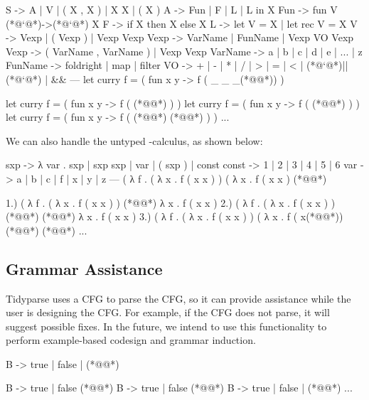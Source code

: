 \documentclass[sigplan,review,anonymous,acmsmall]{acmart}\settopmatter{printfolios=false,printccs=false,printacmref=false}
\begin{document}
\begin{tidyinput}
S -> A | V | ( X , X ) | X X | ( X )
A -> Fun | F | L | L in X
Fun -> fun V (*@`@*)->(*@`@*) X
F -> if X then X else X
L -> let V = X | let rec V = X
V -> Vexp | ( Vexp ) | Vexp Vexp
Vexp -> VarName | FunName | Vexp VO Vexp
Vexp -> ( VarName , VarName ) | Vexp Vexp
VarName -> a | b | c | d | e | ... | z
FunName -> foldright | map | filter
VO ->  + | - | * | / | > | = | < | (*@`@*)||(*@`@*) | &&
---
let curry f = ( fun x y -> f ( _ _ _(*@\caret{ }@*)) )
\end{tidyinput}
\begin{tidyoutput}
let curry f = ( fun x y -> f ( (*@@*) ) )
let curry f = ( fun x y -> f ( (*@@*) ) )
let curry f = ( fun x y -> f ( (*@@*) (*@@*) ) )
...
\end{tidyoutput}

\noindent We can also handle the untyped \lambda-calculus, as shown below:

\begin{tidyinput}
sxp -> λ var . sxp | sxp sxp | var | ( sxp ) | const
const -> 1 | 2 | 3 | 4 | 5 | 6
var -> a | b | c | f | x | y | z
---
( λ f . ( λ x . f ( x x ) ) ( λ x . f ( x x ) (*@\caret{ }@*)
\end{tidyinput}
\begin{tidyoutput}
1.) ( λ f . ( λ x . f ( x x ) ) (*@\hlorange{)}@*) λ x . f ( x x )
2.) ( λ f . ( λ x . f ( x x ) ) (*@@*) (*@\hlgreen{)}@*) λ x . f ( x x )
3.) ( λ f . ( λ x . f ( x x ) ) ( λ x . f ( x(*@\hlred{ }@*)) (*@\hlgreen{)}@*) (*@\hlgreen{)}@*)
...
\end{tidyoutput}

\subsection{Grammar Assistance}

Tidyparse uses a CFG to parse the CFG, so it can provide assistance while the user is designing the CFG. For example, if the CFG does not parse, it will suggest possible fixes. In the future, we intend to use this functionality to perform example-based codesign and grammar induction.

\begin{tidyinput}
B -> true | false | (*@\caret{ }@*)
\end{tidyinput}
\begin{tidyoutput}
B -> true | false (*@\hlred{ }@*)
B -> true | false (*@@*)
B -> true | false | (*@@*)
...
\end{tidyoutput}
\end{document}
